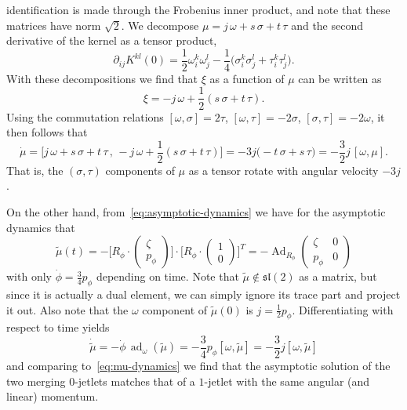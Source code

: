 \documentclass[12pt]{amsart}
\DeclareMathOperator{\Ad}{Ad}
\DeclareMathOperator{\ad}{ad}
\begin{document}
identification is made through the Frobenius inner product, and note
that these matrices have norm $\sqrt{2}$. We decompose
$\mu = j\,\omega + s\,\sigma + t\,\tau$ and the second derivative of
the kernel as a tensor product,
\begin{equation*}
  \partial_{ij} K^{kl}(0)
  = \frac{1}{2} \omega_i^k \omega_j^l
   -\frac{1}{4} \big( \sigma_i^k \sigma_j^l + \tau_i^k \tau_j^l \big).
\end{equation*}
With these decompositions we find that $\xi$ as a function of $\mu$
can be written as
\begin{equation*}
  \xi = -j\,\omega + \frac{1}{2}(s\,\sigma + t\,\tau).
\end{equation*}
Using the commutation relations $[\omega,\sigma] = 2\tau$,
$[\omega,\tau] = -2\sigma$, $[\sigma,\tau] = -2\omega$, it then
follows that
\begin{equation}\label{eq:mu-dynamics}
  \dot{\mu}
  = \big[j\,\omega+s\,\sigma+t\,\tau \,,\, -j\,\omega + \frac{1}{2}(s\,\sigma + t\,\tau)\big]
  = -3j\big(-t\,\sigma + s\,\tau\big)
  = -\frac{3}{2}j\,[\omega,\mu].
\end{equation}
That is, the $(\sigma,\tau)$ components of $\mu$ as a tensor rotate
with angular velocity $-3j$.

On the other hand, from~\eqref{eq:asymptotic-dynamics} we have for the
asymptotic dynamics that
\begin{equation*}
  \tilde{\mu}(t)
  = -\Big[R_\phi \cdot \begin{pmatrix} \zeta \\ p_\phi \end{pmatrix}\Big] \cdot
     \Big[R_\phi \cdot \begin{pmatrix} 1   \\ 0         \end{pmatrix}\Big]^T
  = -\Ad_{R_\phi} \begin{pmatrix} \zeta & 0 \\ p_\phi & 0 \end{pmatrix}
\end{equation*}
with only $\dot{\phi} = \frac{3}{4} p_\phi$ depending on time.
Note that $\tilde{\mu} \not\in \mathfrak{sl}(2)$ as a matrix, but
since it is actually a dual element, we can simply ignore its trace
part and project it out. Also note that the $\omega$ component of
$\tilde{\mu}(0)$ is $j = \frac{1}{2}p_\phi$. Differentiating with respect to 
time yields
\begin{equation*}
  \dot{\tilde{\mu}}
  = -\dot{\phi}\,\ad_\omega(\tilde{\mu})
  = -\frac{3}{4} p_\phi [\omega,\tilde{\mu}]
  = -\frac{3}{2} j [\omega,\tilde{\mu}]
\end{equation*}
and comparing to~\eqref{eq:mu-dynamics} we find that the asymptotic
solution of the two merging $0$-jetlets matches that of a $1$-jetlet
with the same angular (and linear) momentum.
\end{document}
